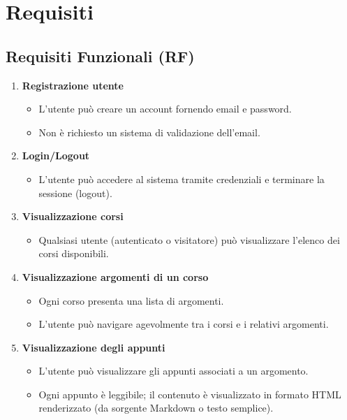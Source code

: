 \chapter{Requisiti}

\section{Requisiti Funzionali (RF)}

\begin{enumerate}[label=\textbf{RF\arabic*}, widest=RF10, leftmargin=*, align=left]
    \item \textbf{Registrazione utente}
        \begin{itemize}[nosep, leftmargin=0cm]
            \item L'utente può creare un account fornendo email e password.
            \item Non è richiesto un sistema di validazione dell'email.
        \end{itemize}

    \item \textbf{Login/Logout}
        \begin{itemize}[nosep, leftmargin=0cm]
            \item L'utente può accedere al sistema tramite credenziali e terminare la sessione (logout).
        \end{itemize}

    \item \textbf{Visualizzazione corsi}
        \begin{itemize}[nosep, leftmargin=0cm]
            \item Qualsiasi utente (autenticato o visitatore) può visualizzare l'elenco dei corsi disponibili.
        \end{itemize}

    \item \textbf{Visualizzazione argomenti di un corso}
        \begin{itemize}[nosep, leftmargin=0cm]
            \item Ogni corso presenta una lista di argomenti.
            \item L'utente può navigare agevolmente tra i corsi e i relativi argomenti.
        \end{itemize}

    \item \textbf{Visualizzazione degli appunti}
        \begin{itemize}[nosep, leftmargin=0cm]
            \item L'utente può visualizzare gli appunti associati a un argomento.
            \item Ogni appunto è leggibile; il contenuto è visualizzato in formato HTML renderizzato (da sorgente Markdown o testo semplice).
        \end{itemize}


\end{enumerate}
